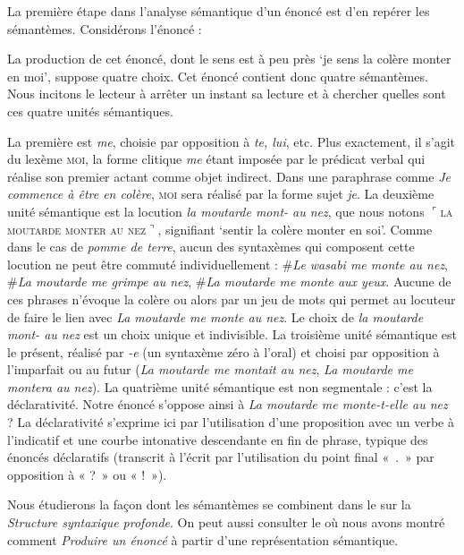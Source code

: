 La première étape dans l’analyse sémantique d’un énoncé est d’en repérer les sémantèmes. Considérons l’énoncé :

\z

La production de cet énoncé, dont le sens est à peu près ‘je sens la colère monter en moi’, suppose quatre choix. Cet énoncé contient donc quatre sémantèmes. Nous incitons le lecteur à arrêter un instant sa lecture et à chercher quelles sont ces quatre unités sémantiques.

La première est \textit{me}, choisie par opposition à \textit{te, lui}, etc. Plus exactement, il s’agit du lexème \textsc{moi}, la forme clitique \textit{me} étant imposée par le prédicat verbal qui réalise son premier actant comme objet indirect. Dans une paraphrase comme \textit{Je commence à être en colère}, \textsc{moi} sera réalisé par la forme sujet \textit{je}. La deuxième unité sémantique est la locution \textit{la moutarde mont- au nez}, que nous notons $⌜$\textsc{la} \textsc{moutarde} \textsc{monter} \textsc{au} \textsc{nez}$⌝$, signifiant ‘sentir la colère monter en soi’. Comme dans le cas de \textit{pomme de terre}, aucun des syntaxèmes qui composent cette locution ne peut être commuté individuellement : \#\textit{Le wasabi me monte au nez}, \#\textit{La moutarde me grimpe au nez}, \#\textit{La moutarde me monte aux yeux}. Aucune de ces phrases n’évoque la colère ou alors par un jeu de mots qui permet au locuteur de faire le lien avec \textit{La moutarde me monte au nez}. Le choix de \textit{la moutarde mont- au nez} est un choix unique et indivisible. La troisième unité sémantique est le présent, réalisé par \textit{{}-e} (un syntaxème zéro à l’oral) et choisi par opposition à l’imparfait ou au futur (\textit{La moutarde me montait au nez}, \textit{La moutarde me montera au nez}). La quatrième unité sémantique est non segmentale : c’est la déclarativité. Notre énoncé s’oppose ainsi à \textit{La moutarde me monte-t-elle au nez} ? La déclarativité s’exprime ici par l’utilisation d’une proposition avec un verbe à l’indicatif et une courbe intonative descendante en fin de phrase, typique des énoncés déclaratifs (transcrit à l’écrit par l’utilisation du point final «~.~» par opposition à « ?~» ou « !~»).

Nous étudierons la façon dont les sémantèmes se combinent dans le  sur la \textit{Structure syntaxique profonde}. On peut aussi consulter le  où nous avons montré comment \textit{Produire un énoncé} à partir d’une représentation sémantique.

